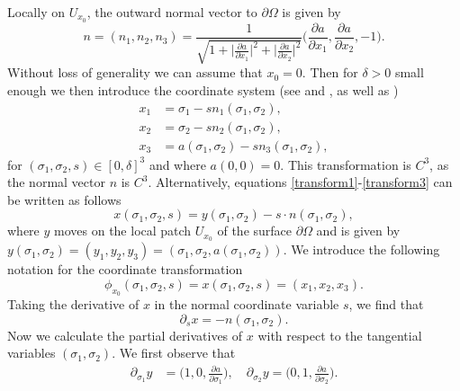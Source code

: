 \documentclass[12pt,a4paper]{article}
\theoremstyle{definition}
\theoremstyle{remark}
\numberwithin{equation}{section}
\begin{document}
Locally on $U_{x_0}$, the outward normal vector to $\partial \Omega$ is given by
\begin{equation*}
n = (n_1, n_2, n_3) = \frac{1}{\sqrt{1 + \big\lvert \frac{\partial a}{\partial x_1} \big\rvert^2 + \big\lvert \frac{\partial a}{\partial x_2} \big\rvert^2 }} \bigg( \frac{\partial a}{\partial x_1} ,  \frac{\partial a}{\partial x_2}, -1 \bigg).
\end{equation*}
Without loss of generality we can assume that $x_0 = 0$. Then for $\delta > 0$ small enough we then introduce the coordinate system (see \cite{bardos2021} and \cite[~Theorem 2.12]{wloka}, as well as \cite[~Appendix C.5]{hormander3})
\begingroup
\allowdisplaybreaks
\begin{align}
x_1 &= \sigma_1 - s n_1 (\sigma_1, \sigma_2), \label{transform1} \\
x_2 &= \sigma_2 - s n_2 (\sigma_1, \sigma_2), \label{transform2} \\
x_3 &= a (\sigma_1, \sigma_2) - s n_3 (\sigma_1, \sigma_2), \label{transform3}
\end{align}
\endgroup
for $(\sigma_1, \sigma_2, s) \in [0, \delta]^3$ and where $a(0,0) = 0$.
This transformation is $C^3$, as the normal vector $n$ is $C^3$. Alternatively, equations \eqref{transform1}-\eqref{transform3} can be written as follows 
\begin{equation}
x (\sigma_1, \sigma_2, s) = y (\sigma_1, \sigma_2) - s \cdot n (\sigma_1, \sigma_2),
\end{equation}
where $y$ moves on the local patch $U_{x_0}$ of the surface $\partial \Omega$ and is given by $y (\sigma_1, \sigma_2) = (y_1, y_2, y_3) = (\sigma_1, \sigma_2, a (\sigma_1, \sigma_2))$. We introduce the following notation for the coordinate transformation
\begin{equation}
\phi_{x_0} (\sigma_1, \sigma_2 , s) = x (\sigma_1, \sigma_2, s) = (x_1, x_2, x_3).
\end{equation}
Taking the derivative of $x$ in the normal coordinate variable $s$, we find that
\begin{equation*}
\partial_s x = - n (\sigma_1, \sigma_2).
\end{equation*}
Now we calculate the partial derivatives of $x$ with respect to the tangential variables $(\sigma_1, \sigma_2)$. We first observe that
\begin{align*}
\partial_{\sigma_1} y &= \bigg( 1 , 0, \frac{\partial a}{\partial \sigma_1} \bigg), \quad \partial_{\sigma_2} y = \bigg(0, 1, \frac{\partial a}{\partial \sigma_2} \bigg).
\end{align*}
\end{document}
